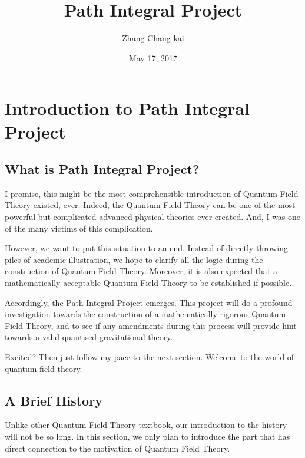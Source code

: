 \documentclass[letterpaper,10pt,english]{sphinxmanual}
\title{Path Integral Project}
\date{May 17, 2017}
\author{Zhang Chang-kai}
\begin{document}
\maketitle
\sphinxtableofcontents
{}\label{\detokenize{index::doc}}



\chapter{Introduction to Path Integral Project}
\label{\detokenize{intro:introduction-to-path-integral-project}}\label{\detokenize{intro:path-integral-project}}\label{\detokenize{intro::doc}}

\section{What is Path Integral Project?}
\label{\detokenize{intro_what:what-is-path-integral-project}}\label{\detokenize{intro_what::doc}}
I promise, this might be the most comprehensible introduction of Quantum Field Theory existed, ever. Indeed, the Quantum Field Theory can be one of the most powerful but complicated advanced physical theories ever created. And, I was one of the many victims of this complication.

However, we want to put this situation to an end. Instead of directly throwing piles of academic illustration, we hope to clarify all the logic during the construction of Quantum Field Theory. Moreover, it is also expected that a mathematically acceptable Quantum Field Theory to be established if possible.

Accordingly, the Path Integral Project emerges. This project will do a profound investigation towards the construction of a mathematically rigorous Quantum Field Theory, and to see if any amendments during this process will provide hint towards a valid quantised gravitational theory.

Excited? Then just follow my pace to the next section. Welcome to the world of quantum field theory.


\section{A Brief History}
\label{\detokenize{intro_history:a-brief-history}}\label{\detokenize{intro_history::doc}}
Unlike other Quantum Field Theory textbook, our introduction to the history will not be so long. In this section, we only plan to introduce the part that has direct connection to the motivation of Quantum Field Theory.
\end{document}
